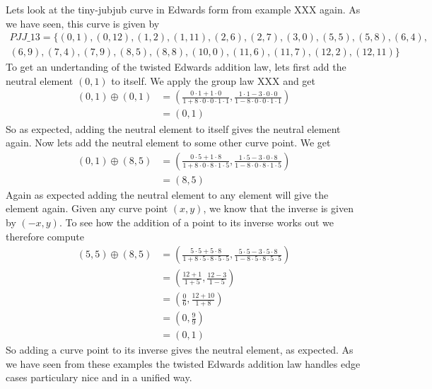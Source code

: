 \begin{example} Lets look at the tiny-jubjub curve in Edwards form from example XXX again. As we have seen, this curve is given by
\begin{multline*}
\mathit{PJJ\_13} = \{(0, 1),(0, 12),(1, 2),(1, 11),(2, 6),(2, 7),(3, 0),(5, 5),(5, 8),(6, 4),\\
(6, 9),(7, 4),(7, 9),(8, 5),(8, 8),(10, 0),(11, 6),(11, 7),(12, 2),(12, 11)\}
\end{multline*}
To get an undertanding of the twisted Edwards addition law, lets first add the neutral element $(0,1)$ to itself. We apply the group law XXX and get
\begin{align*}
(0, 1) \oplus (0, 1) &= \left(\frac{0\cdot 1+1 \cdot 0}{1 +8\cdot0\cdot 0\cdot 1\cdot 1},\frac{1\cdot 1-3\cdot 0\cdot 0}{1-8\cdot 0\cdot 0\cdot 1\cdot 1}\right)\\
                     & = (0,1)
\end{align*}
So as expected, adding the neutral element to itself gives the neutral element again. Now lets add the neutral element to some other curve point. We get
\begin{align*}
(0, 1) \oplus (8, 5) &= \left(\frac{0\cdot 5+1 \cdot 8}{1 +8\cdot0\cdot 8\cdot 1\cdot 5},\frac{1\cdot 5 - 3\cdot 0\cdot 8}{1-8\cdot 0\cdot 8\cdot 1\cdot 5}\right)\\
                     & = (8,5)
\end{align*}
Again as expected adding the neutral element to any element will give the element again. Given any curve point $(x,y)$, we know that the inverse is given by $(-x,y)$. To see how the addition of a point to its inverse works out we therefore compute 
\begin{align*}
(5, 5) \oplus (8, 5) &= \left(\frac{5\cdot 5+5 \cdot 8}{1 +8\cdot 5\cdot 8\cdot 5\cdot 5},\frac{5\cdot 5 - 3\cdot 5\cdot 8}{1-8\cdot 5\cdot 8\cdot 5\cdot 5}\right)\\
                     &= \left(\frac{12+1}{1 +5},\frac{12 - 3}{1-5}\right)\\
                     &= \left(\frac{0}{6},\frac{12 + 10}{1+8}\right)\\
                     &= \left(0,\frac{9}{9}\right)\\
                     &=  (0,1)
\end{align*}
So adding a curve point to its inverse gives the neutral element, as expected. As we have seen from these examples the twisted Edwards addition law handles edge cases particulary nice and in a unified way.
\end{example}

